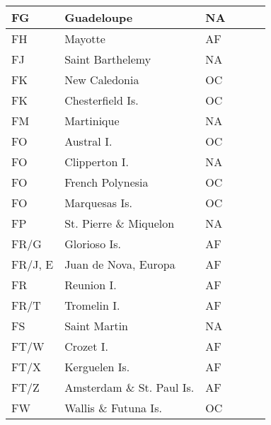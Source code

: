 \documentclass[a4paper]{article}
\begin{document}
\begin{longtable}{|p{1.5cm}|p{4cm}|l|p{2cm}|p{2cm}|p{2cm}|}
\hline
FG                     & Guadeloupe                                 & NA    & & & \\
\hline
FH                     & Mayotte                                    & AF    & & & \\
\hline
FJ                     & Saint Barthelemy                           & NA    & & & \\
\hline
FK                     & New Caledonia                              & OC    & & & \\
\hline
FK                     & Chesterfield Is.                           & OC    & & & \\
\hline
FM                     & Martinique                                 & NA    & & & \\
\hline
FO                     & Austral I.                                 & OC    & & & \\
\hline
FO                     & Clipperton I.                              & NA    & & & \\
\hline
FO                     & French Polynesia                           & OC    & & & \\
\hline
FO                     & Marquesas Is.                              & OC    & & & \\
\hline
FP                     & St. Pierre \& Miquelon                     & NA    & & & \\
\hline
FR/G                   & Glorioso Is.                               & AF    & & & \\
\hline
FR/J, E                & Juan de Nova, Europa                       & AF    & & & \\
\hline
FR                     & Reunion I.                                 & AF    & & & \\
\hline
FR/T                   & Tromelin I.                                & AF    & & & \\
\hline
FS                     & Saint Martin                               & NA    & & & \\
\hline
FT/W                   & Crozet I.                                  & AF    & & & \\
\hline
FT/X                   & Kerguelen Is.                              & AF    & & & \\
\hline
FT/Z                   & Amsterdam \& St. Paul Is.                  & AF    & & & \\
\hline
FW                     & Wallis \& Futuna Is.                       & OC    & & & \\

\end{longtable}
\end{document}
